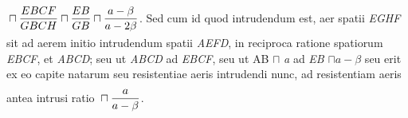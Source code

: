 $\rule[-4mm]{0mm}{10mm}\displaystyle \sqcap \frac{EBCF}{GBCH} \sqcap \frac{EB}{GB} \sqcap \frac{a-\beta}{a-2\beta}$. Sed cum id quod intrudendum est,  aer spatii \textit{EGHF} sit ad aerem initio intrudendum spatii \textit{AEFD}, in reciproca ratione spatiorum \textit{EBCF}, et \textit{ABCD}; seu ut \textit{ABCD} ad \textit{EBCF}, seu ut AB $\sqcap$ \textit{a} ad \textit{EB} $\sqcap a - \beta$ seu erit ex eo capite natarum  seu resistentiae aeris intrudendi nunc, ad resistentiam aeris antea intrusi ratio $\rule[-4mm]{0mm}{10mm}\displaystyle \sqcap \frac{a}{a-\beta}$.\pend 
